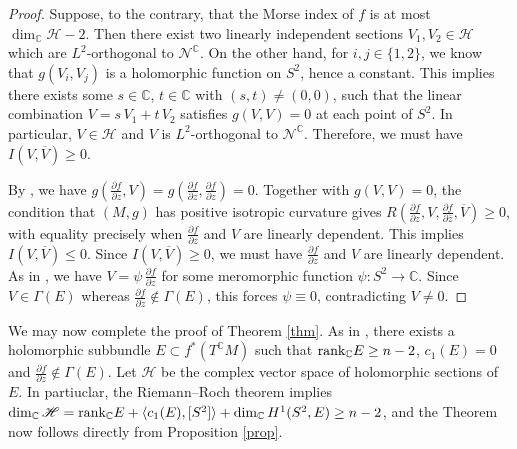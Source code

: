 \documentclass[11pt]{amsart}
\theoremstyle{definition}
\begin{document}
\begin{proof}
Suppose, to the contrary, that the Morse index of $f$ is at most $\dim_{\mathbb C}\mathscr H-2$. Then there exist two linearly independent sections $V_1,V_2\in \mathscr{H}$ which are $L^2$-orthogonal to $\mathscr N^{\mathbb{C}}$. On the other hand, for $i,j\in \{1,2\}$, we know that $g(V_i,V_j)$ is a holomorphic function on $S^2$, hence a constant. This implies there exists some $s\in \mathbb{C}$, $t\in \mathbb{C}$ with $(s,t)\neq (0,0)$, such that the linear combination $V=s\,V_1+t\,V_2$ satisfies $g(V,V)=0$ at each point of $S^2$. In particular, $V\in\mathscr{H}$ and $V$ is $L^2$-orthogonal to $\mathscr N^{\mathbb{C}}$. Therefore, we must have $I(V,\overline{V})\geq 0$.

By \cite[Proposition 1.17]{Brendle2010}, we have $g(\frac{\partial f}{\partial z},V)=g(\frac{\partial f}{\partial z},\frac{\partial f}{\partial z})=0$. Together with $g(V,V)=0$, the condition that $(M,g)$ has positive isotropic curvature gives $R(\frac{\partial f}{\partial z},V,\frac{\partial f}{\partial\bar z},\overline V)\ge0$, with equality precisely when $\frac{\partial f}{\partial z}$ and $V$ are linearly dependent. This implies $I(V,\overline{V})\leq  0$. Since $I(V,\overline{V})\geq 0$, we must have $\frac{\partial f}{\partial z}$ and $V$ are linearly dependent. As in \cite[Theorem 1.19]{Brendle2010}, we have $V=\psi\,\frac{\partial f}{\partial z}$ for some meromorphic function $\psi:S^2\to\mathbb{C}$. Since $V\in\Gamma(E)$ whereas $\frac{\partial f}{\partial z}\notin\Gamma(E)$, this forces $\psi\equiv0$, contradicting $V\ne0$. 
\end{proof}
We may now complete the proof of Theorem \ref{thm}. As in \cite[Proposition 1.18]{Brendle2010}, there exists a holomorphic subbundle $E\subset f^*(T^{\mathbb C}M)$ such that $\text{\rm rank}_{\mathbb{C}}E\geq n-2$, $c_1(E)=0$ and $\frac{\partial f}{\partial z}\notin\Gamma(E)$. Let $\mathscr H$ be the complex vector space of holomorphic sections of $E$. In partiuclar, the Riemann--Roch theorem implies $\dim_{\mathbb{C}}\mathscr{H}=\text{\rm rank}_{\mathbb{C}}E\mathbin{+}\langle c_1(E),[S^2]\rangle+\dim_{\mathbb{C}}H^1(S^2,E)\geq n-2$, and the Theorem now follows directly from Proposition \ref{prop}.
\appendix
\end{document}
